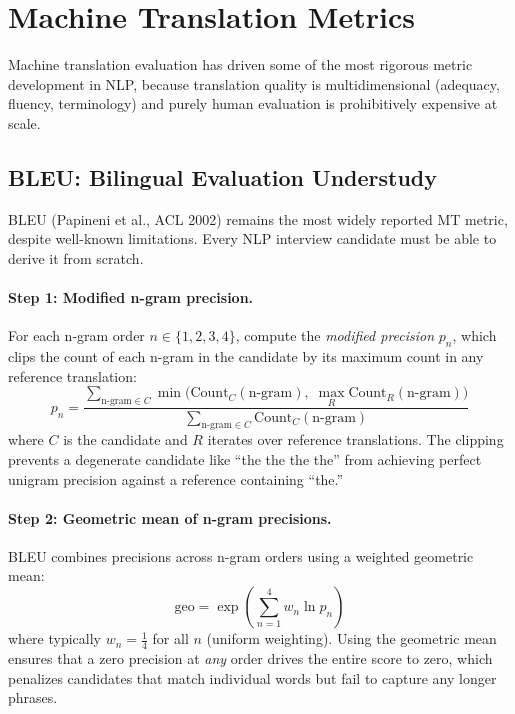 \section{Machine Translation Metrics}
\label{sec:mt_metrics}

Machine translation evaluation has driven some of the most rigorous metric
development in NLP, because translation quality is multidimensional (adequacy,
fluency, terminology) and purely human evaluation is prohibitively expensive at
scale.

\subsection{BLEU: Bilingual Evaluation Understudy}
\label{sec:bleu}

BLEU (Papineni et al., ACL 2002) remains the most widely reported MT metric,
despite well-known limitations.  Every NLP interview candidate must be able to
derive it from scratch.

\paragraph{Step 1: Modified n-gram precision.}
For each n-gram order $n \in \{1,2,3,4\}$, compute the \emph{modified precision}
$p_n$, which clips the count of each n-gram in the candidate by its maximum count
in any reference translation:
\[
    p_n = \frac{\sum_{\text{n-gram} \in C}\min\!\bigl(\text{Count}_C(\text{n-gram}),\;\max_{R}\text{Count}_R(\text{n-gram})\bigr)}{\sum_{\text{n-gram} \in C}\text{Count}_C(\text{n-gram})}
\]
where $C$ is the candidate and $R$ iterates over reference translations.  The
clipping prevents a degenerate candidate like ``the the the the'' from achieving
perfect unigram precision against a reference containing ``the.''

\paragraph{Step 2: Geometric mean of n-gram precisions.}
BLEU combines precisions across n-gram orders using a weighted geometric mean:
\[
    \text{geo} = \exp\!\left(\sum_{n=1}^{4} w_n \ln p_n\right)
\]
where typically $w_n = \frac{1}{4}$ for all $n$ (uniform weighting).  Using the
geometric mean ensures that a zero precision at \emph{any} order drives the
entire score to zero, which penalizes candidates that match individual words but
fail to capture any longer phrases.

